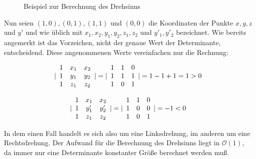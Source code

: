 \documentclass[ngerman,draft,parskip=half*,twoside]{scrreprt}
\theoremstyle{break}
\theoremstyle{nonumberbreak}
\newcommand*{\OO}{\mathcal{O}}      %
\DeclarePairedDelimiter{\abs}{\lvert}{\rvert}
\begin{document}
\begin{figure}[H]
\centering

\caption{Beispiel zur Berechnung des Drehsinns}
\label{drehsinnskizze}
\end{figure}

Nun seien $(1,0), (0,1), (1,1)$ und $(0,0)$ die Koordinaten der Punkte $x,y,z$ und $y'$ 
und wie üblich mit $x_1, x_2, y_1, y_2, z_1, z_2$ und $y'_1, y'_2$
bezeichnet. Wie bereits angemerkt ist das Vorzeichen, nicht der genaue Wert der
Determinante, entscheidend. Diese angenommenen Werte vereinfachen nur die Rechnung:

\[ \abs{ 
\begin{array}{ccc}
1 & x_1 & x_2\\
1 & y_1 & y_2\\
1 & z_1 & z_2\\
\end{array} 
}=
\abs{ 
\begin{array}{ccc}
1 & 1 & 0\\
1 & 1 & 1\\
1 & 0 & 1\\
\end{array} 
}=1-1+1=1>0 \]

\[ \abs{ 
\begin{array}{ccc}
1 & x_1 & x_2\\
1 & y'_1 & y'_2\\
1 & z_1 & z_2\\
\end{array} 
}=
\abs{ 
\begin{array}{ccc}
1 & 1 & 0\\
1 & 0 & 0\\
1 & 0 & 1\\
\end{array} 
}=-1<0 \]

In dem einen Fall handelt es sich also um eine Linksdrehung, im anderen um eine Rechtsdrehung. Der Aufwand für die Berechnung des
Drehsinns liegt in $\OO(1)$, da immer nur eine Determinante konstanter Größe berechnet werden muß.
\end{document}

